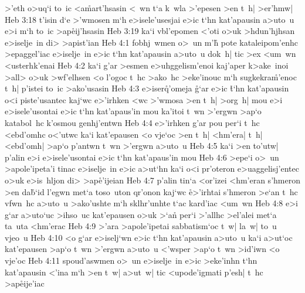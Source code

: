 >'eth
o>uq`i
to~ic
<a\r{m}art'hsasin
<~wn
t`a
k~wla
>'epesen
>en
t~h|
>er'hmw|\bibvsend
\vs Heb 3:18
t'isin
d`e
>'wmosen
m`h
e>isele'usesjai
e>ic
t`hn
kat'apausin
a>uto~u
e>i
m`h
to~ic
>ap\r{e}ij'hsasin\bibvsend
{}
\vs Heb 3:19
ka`i
vbl'epomen
<'oti
o>uk
>hdun'hjhsan
e>iselje~in
di>
>apist'ian\bibvsend
\vs Heb 4:1
fobhj~wmen
o>~un
m'h\r{}
pote
kataleipom'enhc
>epaggel'iac
e>iselje~in
e>ic
t`hn
kat'apausin
a>uto~u
dok~h|
tic
>ex
<um~wn
<usterhk'enai\bibvsend
\vs Heb 4:2
ka`i
g'ar
>esmen
e>uhggelism'enoi
kaj'aper
k>ake~inoi
>all>
o>uk
>wf'elhsen
<o
l'ogoc
t~hc
>ako~hc
>eke'inouc
m`h
sugkekra\r{m}'enoc
t~h|
p'istei
to~ic
>ako'usasin\bibvsend
\vs Heb 4:3
e>iser\r{q}'omeja
\r{g}`ar
e>ic
\r{t}`hn
kat'apausin
o<i
piste'usantec
kaj`wc
e>'irhken
<wc
>'wmosa
>en
t~h|
>org~h|
mou
e>i
e>isele'usontai
e>ic
t`hn
kat'apaus'in
mou
ka'itoi
t~wn
>'ergwn
>ap`o
katabol~hc
k'osmou
genhj'entwn\bibvsend
\vs Heb 4:4
e>'irhken
g'ar
pou
per`i
t~hc
<ebd'omhc
o<'utwc
ka`i
kat'epausen
<o
vje`oc
>en
t~h|
<hm'era|
t~h|
<ebd'omh|
>ap`o
p'antwn
t~wn
>'ergwn
a>uto~u\bibvsend
\vs Heb 4:5
ka`i
>en
to'utw|
p'alin
e>i
e>isele'usontai
e>ic
t`hn
kat'apaus'in
mou\bibvsend
\vs Heb 4:6
>epe`i
o>~un
>apole'ipeta'i
tinac
e>iselje~in
e>ic
a>ut`hn
ka`i
o<i
pr'oteron
e>uaggelisj'entec
o>uk
e>is~hljon
di>
>ap\r{e}'ijeian\bibvsend
{}
\vs Heb 4:7
p'alin
tin`a
<or'izei
<hm'eran
s'hmeron
>en
da\r{b}`id
l'egwn
met`a
toso~uton
qr'onon
kaj`wc
\r{e}>'irhtai
s'hmeron
>e`an
t~hc
vfwn~hc
a>uto~u
>ako'ushte
m`h
sklhr'unhte
t`ac
kard'iac
<um~wn\bibvsend
\vs Heb 4:8
e>i
g`ar
a>uto`uc
>ihso~uc
kat'epausen
o>uk
>`a\r{n}
per`i
>'allhc
>el'alei
met`a
ta~uta
<hm'erac\bibvsend
\vs Heb 4:9
>'ara
>apole'ipetai
sabbatism`oc
t~w|
la~w|
to~u
vjeo~u\bibvsend
\vs Heb 4:10
<o
g`ar
e>iselj`wn
e>ic
t`hn
kat'apausin
a>uto~u
ka`i
a>ut`oc
kat'epausen
>ap`o
t~wn
>'ergwn
a>uto~u
<'wsper
>ap`o
t~wn
>id'iwn
<o
vje'oc\bibvsend
\vs Heb 4:11
spoud'aswmen
o>~un
e>iselje~in
e>ic
>eke'inhn
t`hn
kat'apausin
<'ina
m`h
>en
t~w|
a>ut~w|
tic
<upode'igmati
p'esh|
t~hc
>ap\r{e}ije'iac\bibvsend
{}
